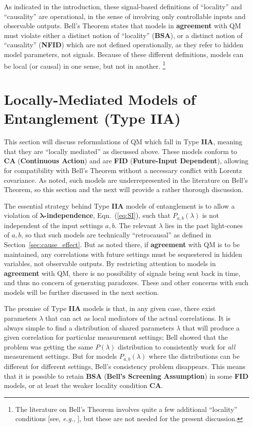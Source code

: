 \documentclass[onecolumn, nofootinbib, 12pt]{revtex4-1}
\begin{document}
As indicated in the introduction, these signal-based definitions of ``locality'' and ``causality'' are operational, in the sense of involving only controllable inputs and observable outputs.  Bell's Theorem states that models in {\bf agreement} with QM must violate either a distinct notion of ``locality'' ({\bf BSA}), or a distinct notion of ``causality'' ({\bf NFID}) which are not defined operationally, as they refer to hidden model parameters, not signals.   Because of these different definitions, models can be local (or causal) in one sense, but not in another.%
\footnote{The literature on Bell's Theorem involves quite a few additional ``locality'' conditions [see, \emph{e.g.}, \textcite{wiseman2014}], but these are not needed for the present discussion.}


\section{Locally-Mediated Models of Entanglement (Type {\bf IIA}) }
\label{sec:TypeIIA}

This section will discuss reformulations of QM which fall in Type {\bf IIA}, meaning that they are ``locally mediated'' as discussed above.  These models conform to {\bf CA} ({\bf Continuous Action}) and are {\bf FID} ({\bf Future-Input Dependent}), allowing for compatibility with Bell's Theorem without a necessary conflict with Lorentz covariance.  As noted, such models are underrepresented in the literature on Bell's Theorem, so this section and the next will provide a rather thorough discussion.  

The essential strategy behind Type {\bf IIA} models of entanglement is to allow a violation of {\bf $\bm{\lambda}$-independence}, Eqn.~(\ref{eq:SI}), such that $P_{a,b}(\lambda)$ is not independent of the input settings $a,b$.  The relevant $\lambda$ lies in the past light-cones of $a,b$, so that such models are technically ``retrocausal'' as defined in Section~\ref{sec:cause_effect}.  But as noted there, if {\bf agreement} with QM is to be maintained, any correlations with future settings must be sequestered in hidden variables, not observable outputs.  By restricting attention to models in {\bf agreement} with QM, there is no possibility of signals being sent back in time, and thus no concern of generating paradoxes.  These and other concerns with such models will be further discussed in the next section.  

The promise of Type {\bf IIA} models is that, in any given case, there exist parameters $\lambda$ that can act as local mediators of the actual correlations.  It is always simple to find a distribution of shared parameters $\lambda$ that will produce a given correlation for particular measurement settings; Bell showed that the problem was getting the same $P(\lambda)$ distribution to consistently work for \emph{all} measurement settings.  But for models $P_{a,b}(\lambda)$ where the distributions can be different for different settings, Bell's consistency problem disappears. This means that it is possible to retain {\bf BSA} ({\bf Bell's Screening Assumption}) in some {\bf FID} models, or at least the weaker locality condition {\bf CA}.  
\end{document}
